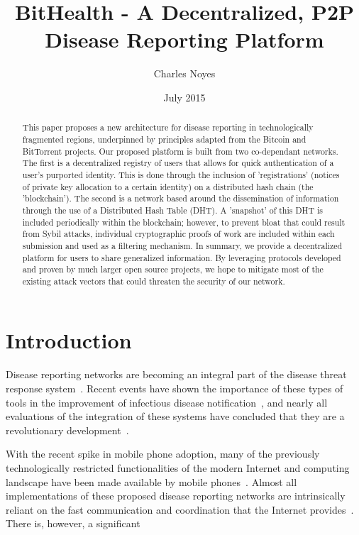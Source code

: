 \documentclass{article}
\title{BitHealth - A Decentralized, P2P Disease Reporting Platform}
\author{Charles Noyes}
\date{July 2015}
\begin{document}
\maketitle

\begin{abstract}
This paper proposes a new architecture for disease reporting in technologically fragmented regions, underpinned by principles adapted from the Bitcoin and BitTorrent projects. Our proposed platform is built from two co-dependant networks. The first is a decentralized registry of users that allows for quick authentication of a user's purported identity. This is done through the inclusion of 'registrations' (notices of private key allocation to a certain identity) on a distributed hash chain (the 'blockchain'). The second is a network based around the dissemination of information through the use of a Distributed Hash Table (DHT). A 'snapshot' of this DHT is included periodically within the blockchain; however, to prevent bloat that could result from Sybil attacks, individual cryptographic proofs of work are included within each submission and used as a filtering mechanism. In summary, we provide a decentralized platform for users to share generalized information. By leveraging protocols developed and proven by much larger open source projects, we hope to mitigate most of the existing attack vectors that could threaten the security of our network.
\end{abstract}


\maketitle

\section{Introduction}
\par Disease reporting networks are becoming an integral part of the disease threat response system~\cite{Heymann:1998ty}. Recent events have shown the importance of these types of tools in the improvement of infectious disease notification~\cite{Ward:2005vk}, and nearly all evaluations of the integration of these systems have concluded that they are a revolutionary development~\cite{Jajosky:2004ty,Lazarus:2009wz,Overhage:2001vq}. 

\par With the recent spike in mobile phone adoption, many of the previously technologically restricted functionalities of the modern Internet and computing landscape have been made available by mobile phones~\cite{Buford:2009jn}. Almost all implementations of these proposed disease reporting networks are intrinsically reliant on the fast communication and coordination that the Internet provides~\cite{Rolfhamre:2005wy,Krause:2007wn}. There is, however, a significant 
\end{document}
